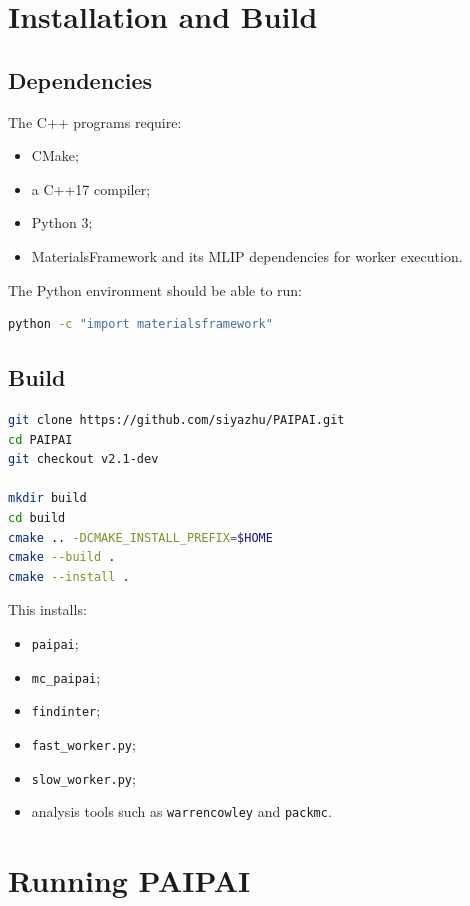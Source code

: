 \documentclass[11pt]{article}
\newcommand{\PAIPAI}{\textsc{PAIPAI}}
\begin{document}
\section{Installation and Build}

\subsection{Dependencies}

The C++ programs require:

\begin{itemize}
  \item CMake;
  \item a C++17 compiler;
  \item Python 3;
  \item MaterialsFramework and its MLIP dependencies for worker execution.
\end{itemize}

The Python environment should be able to run:

\begin{lstlisting}[language=bash]
python -c "import materialsframework"
\end{lstlisting}

\subsection{Build}

\begin{lstlisting}[language=bash]
git clone https://github.com/siyazhu/PAIPAI.git
cd PAIPAI
git checkout v2.1-dev

mkdir build
cd build
cmake .. -DCMAKE_INSTALL_PREFIX=$HOME
cmake --build .
cmake --install .
\end{lstlisting}

This installs:

\begin{itemize}
  \item \texttt{paipai};
  \item \texttt{mc\_paipai};
  \item \texttt{findinter};
  \item \texttt{fast\_worker.py};
  \item \texttt{slow\_worker.py};
  \item analysis tools such as \texttt{warrencowley} and \texttt{packmc}.
\end{itemize}

\section{Running \PAIPAI{}}
\end{document}
